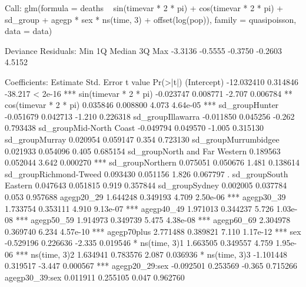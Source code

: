 \documentclass[a4paper]{article}                %
\begin{document}

\begin{Schunk}
\begin{Soutput}
Call:
glm(formula = deaths ~ sin(timevar * 2 * pi) + cos(timevar * 
    2 * pi) + sd_group + agegp * sex * ns(time, 3) + offset(log(pop)), 
    family = quasipoisson, data = data)

Deviance Residuals: 
    Min       1Q   Median       3Q      Max  
-3.3136  -0.5555  -0.3750  -0.2603   4.5152  

Coefficients:
                                Estimate Std. Error t value Pr(>|t|)    
(Intercept)                   -12.032410   0.314846 -38.217  < 2e-16 ***
sin(timevar * 2 * pi)          -0.023747   0.008771  -2.707 0.006784 ** 
cos(timevar * 2 * pi)           0.035846   0.008800   4.073 4.64e-05 ***
sd_groupHunter                 -0.051679   0.042713  -1.210 0.226318    
sd_groupIllawarra              -0.011850   0.045256  -0.262 0.793438    
sd_groupMid-North Coast        -0.049794   0.049570  -1.005 0.315130    
sd_groupMurray                  0.020954   0.059147   0.354 0.723130    
sd_groupMurrumbidgee            0.021933   0.054096   0.405 0.685154    
sd_groupNorth and Far Western   0.189563   0.052044   3.642 0.000270 ***
sd_groupNorthern                0.075051   0.050676   1.481 0.138614    
sd_groupRichmond-Tweed          0.093430   0.051156   1.826 0.067797 .  
sd_groupSouth Eastern           0.047643   0.051815   0.919 0.357844    
sd_groupSydney                  0.002005   0.037784   0.053 0.957688    
agegp20_29                      1.644248   0.349193   4.709 2.50e-06 ***
agegp30_39                      1.733754   0.353111   4.910 9.13e-07 ***
agegp40_49                      1.971013   0.344237   5.726 1.03e-08 ***
agegp50_59                      1.914973   0.349739   5.475 4.38e-08 ***
agegp60_69                      2.304978   0.369740   6.234 4.57e-10 ***
agegp70plus                     2.771488   0.389821   7.110 1.17e-12 ***
sex                            -0.529196   0.226636  -2.335 0.019546 *  
ns(time, 3)1                    1.663505   0.349557   4.759 1.95e-06 ***
ns(time, 3)2                    1.634941   0.783576   2.087 0.036936 *  
ns(time, 3)3                   -1.101448   0.319517  -3.447 0.000567 ***
agegp20_29:sex                 -0.092501   0.253569  -0.365 0.715266    
agegp30_39:sex                  0.011911   0.255105   0.047 0.962760    

\end{Soutput}
\end{Schunk}
\end{document}
